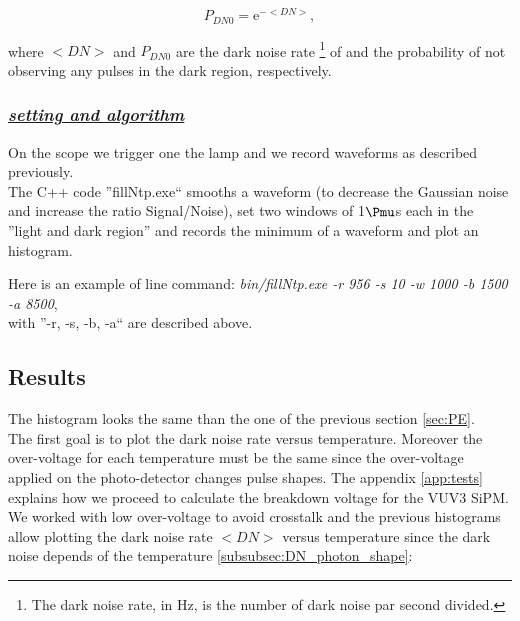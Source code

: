 \documentclass[a4paper, 11pt]{report}%
\begin{document}
  \begin{equation}\label{eq:DN_Poisson}
   P_{DN0} = \mathrm{e}^{-<DN>},
  \end{equation}

  where $<DN>$ and $P_{DN0}$ are the dark noise rate \footnote{The dark noise rate, in Hz, is the number of dark noise par second divided.} 
  of and the probability of not observing any pulses in the dark region, respectively. 
  \\
  
  \newpage
  
  \subsubsection{\textit{\underline{setting and algorithm}}}
 
  On the scope we trigger one the lamp and we record waveforms as described previously.\\  
    
  The C++ code ''fillNtp.exe`` smooths a waveform (to decrease the Gaussian noise and increase the ratio Signal/Noise),
  set two windows of 1$\Pmu$s each in the ''light and dark region'' and records the minimum of a waveform and plot an histogram. 
  
  Here is an example of line command: \textit{bin/fillNtp.exe -r 956 -s 10 -w 1000 -b 1500 -a 8500},\\
  with ''-r, -s, -b, -a`` are described above.   
  
  \subsection{Results}
  
  The histogram looks the same than the one of the previous section \ref{sec:PE}.
  \\
  
  The first goal is to plot the dark noise rate versus temperature. Moreover the over-voltage for each temperature must be the same 
  since the over-voltage applied on the photo-detector changes pulse shapes. The appendix \ref{app:tests}
  explains how we proceed to calculate the breakdown voltage for the VUV3 SiPM.\\
  We worked with low over-voltage to avoid crosstalk and the previous histograms allow plotting the dark noise rate $<DN>$ versus 
  temperature since the dark noise depends of the temperature 
  \ref{subsubsec:DN_photon_shape}:
  
\end{document}
